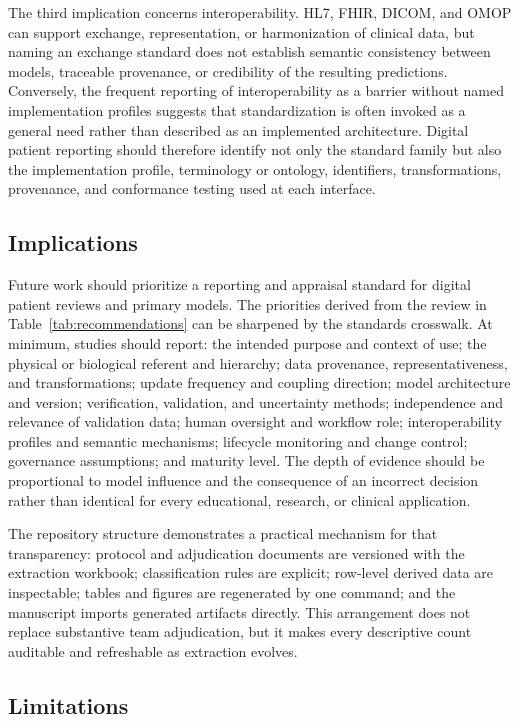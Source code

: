 The third implication concerns interoperability. HL7, FHIR, DICOM, and OMOP can support exchange, representation, or harmonization of clinical data, but naming an exchange standard does not establish semantic consistency between models, traceable provenance, or credibility of the resulting predictions. Conversely, the frequent reporting of interoperability as a barrier without named implementation profiles suggests that standardization is often invoked as a general need rather than described as an implemented architecture. Digital patient reporting should therefore identify not only the standard family but also the implementation profile, terminology or ontology, identifiers, transformations, provenance, and conformance testing used at each interface.

\subsection{Implications}

Future work should prioritize a reporting and appraisal standard for digital patient reviews and primary models. The priorities derived from the review in Table~\ref{tab:recommendations} can be sharpened by the standards crosswalk. At minimum, studies should report: the intended purpose and context of use; the physical or biological referent and hierarchy; data provenance, representativeness, and transformations; update frequency and coupling direction; model architecture and version; verification, validation, and uncertainty methods; independence and relevance of validation data; human oversight and workflow role; interoperability profiles and semantic mechanisms; lifecycle monitoring and change control; governance assumptions; and maturity level. The depth of evidence should be proportional to model influence and the consequence of an incorrect decision rather than identical for every educational, research, or clinical application.

The repository structure demonstrates a practical mechanism for that transparency: protocol and adjudication documents are versioned with the extraction workbook; classification rules are explicit; row-level derived data are inspectable; tables and figures are regenerated by one command; and the manuscript imports generated artifacts directly. This arrangement does not replace substantive team adjudication, but it makes every descriptive count auditable and refreshable as extraction evolves.

\subsection{Limitations}

